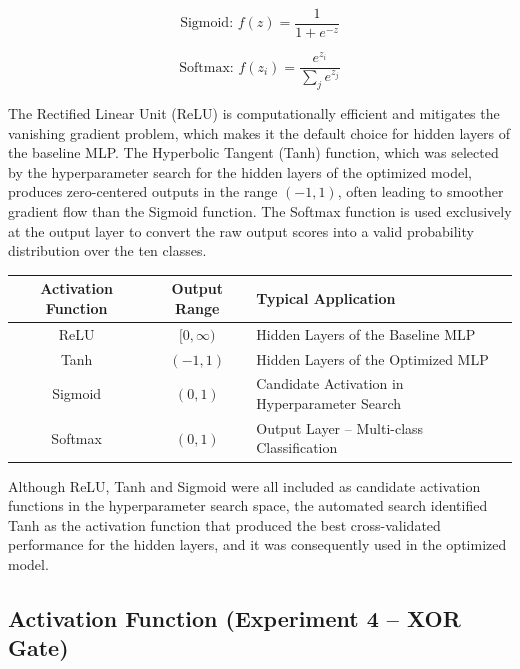 \documentclass[11pt,a4paper]{article}
\begin{document}
\[
\text{Sigmoid: } f(z) = \frac{1}{1+e^{-z}}
\]

\[
\text{Softmax: } f(z_i) = \frac{e^{z_i}}{\displaystyle\sum_{j} e^{z_j}}
\]

The Rectified Linear Unit (ReLU) is computationally efficient and mitigates the vanishing gradient problem, which makes it the default choice for hidden layers of the baseline MLP. The Hyperbolic Tangent (Tanh) function, which was selected by the hyperparameter search for the hidden layers of the optimized model, produces zero-centered outputs in the range $(-1,1)$, often leading to smoother gradient flow than the Sigmoid function. The Softmax function is used exclusively at the output layer to convert the raw output scores into a valid probability distribution over the ten classes.

\vspace{0.15cm}

\begin{center}
\begin{tabular}{|c|c|p{7cm}|}
\hline
\textbf{Activation Function} & \textbf{Output Range} & \textbf{Typical Application}\\
\hline
ReLU & $[0,\infty)$ & Hidden Layers of the Baseline MLP\\
\hline
Tanh & $(-1,1)$ & Hidden Layers of the Optimized MLP\\
\hline
Sigmoid & $(0,1)$ & Candidate Activation in Hyperparameter Search\\
\hline
Softmax & $(0,1)$ & Output Layer -- Multi-class Classification\\
\hline
\end{tabular}
\end{center}

\vspace{0.3cm}

Although ReLU, Tanh and Sigmoid were all included as candidate activation functions in the hyperparameter search space, the automated search identified Tanh as the activation function that produced the best cross-validated performance for the hidden layers, and it was consequently used in the optimized model.





\subsection*{Activation Function (Experiment 4 -- XOR Gate)}
\end{document}
